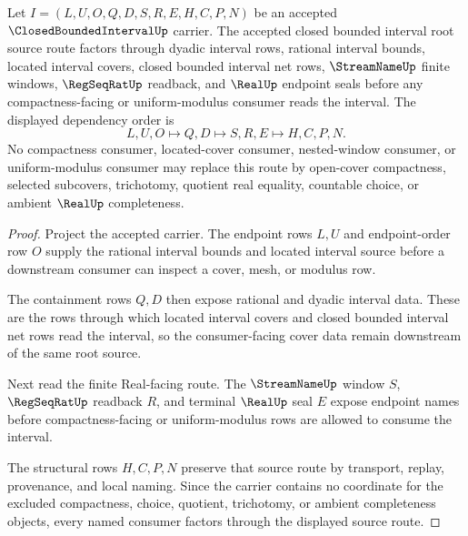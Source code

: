 \begin{theorem}
\label{thm:closed-bounded-interval-root-source-scope-route}
Let $I=(L,U,O,Q,D,S,R,E,H,C,P,N)$ be an accepted $\ClosedBoundedIntervalUp$ carrier. The accepted closed bounded interval root source route factors through dyadic interval rows, rational interval bounds, located interval covers, closed bounded interval net rows, $\StreamNameUp$ finite windows, $\RegSeqRatUp$ readback, and $\RealUp$ endpoint seals before any compactness-facing or uniform-modulus consumer reads the interval. The displayed dependency order is
$$
L,U,O \longmapsto Q,D \longmapsto S,R,E \longmapsto H,C,P,N .
$$
No compactness consumer, located-cover consumer, nested-window consumer, or uniform-modulus consumer may replace this route by open-cover compactness, selected subcovers, trichotomy, quotient real equality, countable choice, or ambient $\RealUp$ completeness.
\end{theorem}
\begin{proof}
Project the accepted carrier. The endpoint rows $L,U$ and endpoint-order row $O$ supply the rational interval bounds and located interval source before a downstream consumer can inspect a cover, mesh, or modulus row.

The containment rows $Q,D$ then expose rational and dyadic interval data. These are the rows through which located interval covers and closed bounded interval net rows read the interval, so the consumer-facing cover data remain downstream of the same root source.

Next read the finite Real-facing route. The $\StreamNameUp$ window $S$, $\RegSeqRatUp$ readback $R$, and terminal $\RealUp$ seal $E$ expose endpoint names before compactness-facing or uniform-modulus rows are allowed to consume the interval.

The structural rows $H,C,P,N$ preserve that source route by transport, replay, provenance, and local naming. Since the carrier contains no coordinate for the excluded compactness, choice, quotient, trichotomy, or ambient completeness objects, every named consumer factors through the displayed source route.
\end{proof}

